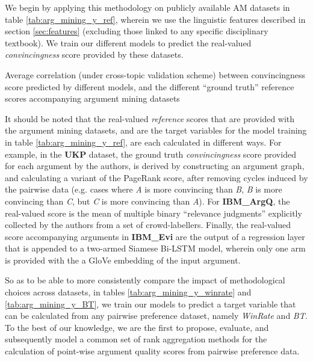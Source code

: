 \documentclass[notitlepage,12pt]{jedm}
\begin{document}
We begin by applying this methodology on publicly available AM 
datasets in table \ref{tab:arg_mining_y_ref}, wherein we use the linguistic 
features described in section \ref{sec:features} (excluding those linked to any 
specific disciplinary textbook).
We train our different models to predict the real-valued 
\textit{convincingness} score provided by these datasets.

\begin{table}
	\caption{Average correlation (under cross-topic validation scheme) between
		convincingness score predicted by different models, and the 
		different ``ground truth'' reference scores accompanying argument mining
		datasets}
	\label{tab:arg_mining_y_ref}
	\parbox{.45\linewidth}{
		\centering
		
	}
	\hfill
	\parbox{.45\linewidth}{
		\centering
		
	}
\end{table}

It should be noted that the real-valued \textit{reference} scores that are 
provided with the argument mining datasets, and are the target variables for 
the model training in table \ref{tab:arg_mining_y_ref}, are each 
calculated in different ways. 
For example, in the \textbf{UKP} dataset, the ground truth 
\textit{convincingness} score provided for each argument by the authors, is 
derived by constructing an argument graph, and calculating a variant of the 
PageRank score, after removing cycles induced by the pairwise data (e.g. cases 
where \textit{A} is more convincing than \textit{B}, \textit{B} is more 
convincing 
than \textit{C}, but \textit{C} is more convincing than \textit{A}).
For \textbf{IBM\_ArgQ}, the real-valued score is the mean of multiple binary 
``relevance judgments'' explicitly collected by the authors from a set of 
crowd-labellers.
Finally, the real-valued score accompanying arguments in \textbf{IBM\_Evi} are 
the output of a regression layer that is appended to a two-armed Siamese 
Bi-LSTM model, wherein only one arm is provided with the a GloVe embedding of 
the input argument.

So as to be able to more consistently compare the impact of methodological 
choices across datasets, in tables \ref{tab:arg_mining_y_winrate} and 
\ref{tab:arg_mining_y_BT}, we train our models to predict a target variable 
that can be calculated from any pairwise preference dataset, namely 
\textit{WinRate} and \textit{BT}.
To the best of our knowledge, we are the first to propose, evaluate, and 
subsequently model a common set of rank aggregation methods for the calculation 
of point-wise argument quality scores from pairwise preference data.
\end{document}

